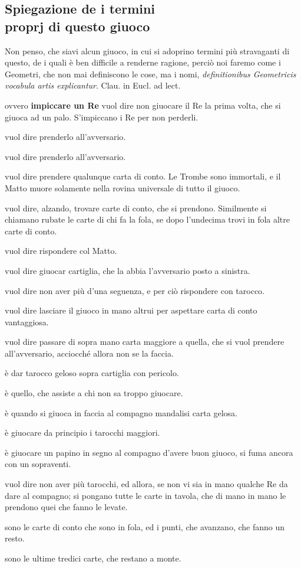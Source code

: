 \documentclass[11pt,a6paper]{article}
\begin{document}
\subsection{Spiegazione de i termini\\ proprj di questo giuoco}

Non penso, che siavi alcun giuoco, in
cui si adoprino termini più stravaganti
di questo, de i quali è ben difficile a renderne
ragione, perciò noi faremo come i Geometri,
che non mai definiscono le cose, ma
i nomi, \textit{definitionibus Geometricis vocabula
artis explicantur}. Clau. in Eucl. ad lect.
\begin{description}
\setlength{\itemsep}{-3pt}
\item[Affogare un Re] ovvero {\bf impiccare un
Re} vuol dire non giuocare il Re la prima
volta, che si giuoca ad un palo. S'impiccano i
Re per non perderli.
\item[Ammazzare un Re] vuol dire prenderlo
all'avversario.
\item[Ammazzare un Papa] vuol dire prenderlo
all'avversario.
\item[Morire] vuol dire prendere qualunque
carta di conto. Le Trombe sono immortali,
e il Matto muore solamente nella rovina
universale di tutto il giuoco.
\item[Rubare] vuol dire, alzando, trovare
carte di conto, che si prendono. Similmente
si chiamano rubate le carte di chi fa la fola, se
dopo l'undecima trovi in fola altre carte di
conto.
\item[Smattare] vuol dire rispondere col Matto.
\item[Rifitta] vuol dire giuocar cartiglia, che la
abbia l'avversario posto a sinistra.
\item[Fare] vuol dire non aver più d'una seguenza,
e per ciò rispondere con tarocco.
\item[Far caccia] vuol dire lasciare il giuoco in
mano altrui per aspettare carta di conto
vantaggiosa.
\item[Far tenuta] vuol dire passare di sopra mano
carta maggiore a quella, che si vuol prendere
all'avversario, acciocché allora non se
la faccia.
\item[Far passata] è dar tarocco geloso sopra
 cartiglia con pericolo.
 \item[Ganzo] è quello, che assiste a chi
non sa troppo giuocare.
\item[Girare una carta] è quando si giuoca in
faccia al compagno mandalisi carta gelosa.
\item[Girare il gioco] è giuocare da principio
i tarocchi maggiori.
\item[Fumare] è giuocare un papino in segno al
compagno d'avere buon giuoco, si fuma
ancora con un sopraventi.
\item[Cascare] vuol dire non aver più tarocchi,
ed allora, se non vi sia in mano qualche Re
da dare al compagno; si pongano tutte le carte
in tavola, che di mano in mano le prendono
quei che fanno le levate.
\item[Entragnos] sono le carte di conto che sono
in fola, ed i punti, che avanzano, che
fanno un resto.
\item[Fola] sono le ultime tredici carte,
 che restano a monte.
 \end{description}
\end{document}
